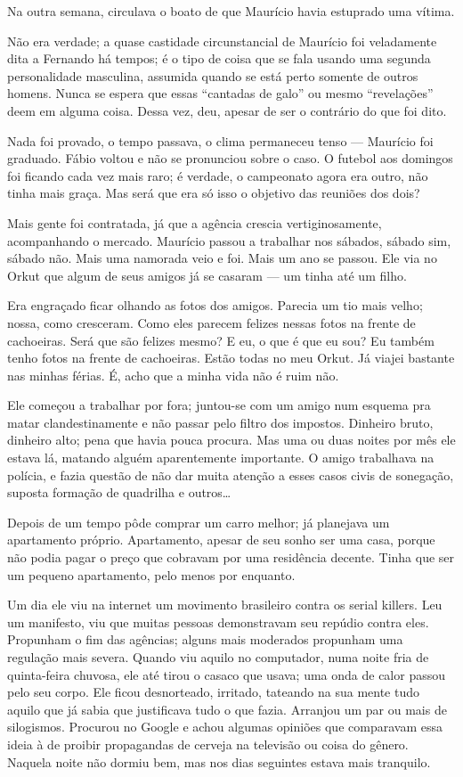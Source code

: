 Na outra semana, circulava o boato de que Maurício havia estuprado uma vítima.

Não era verdade; a quase castidade circunstancial de Maurício foi veladamente dita a Fernando há tempos; é o tipo de coisa que se fala usando uma segunda personalidade masculina, assumida quando se está perto somente de outros homens. Nunca se espera que essas ``cantadas de galo'' ou mesmo ``revelações'' deem em alguma coisa. Dessa vez, deu, apesar de ser o contrário do que foi dito.

Nada foi provado, o tempo passava, o clima permaneceu tenso --- Maurício foi graduado. Fábio voltou e não se pronunciou sobre o caso. O futebol aos domingos foi ficando cada vez mais raro; é verdade, o campeonato agora era outro, não tinha mais graça. Mas será que era só isso o objetivo das reuniões dos dois?

Mais gente foi contratada, já que a agência crescia vertiginosamente, acompanhando o mercado. Maurício passou a trabalhar nos sábados, sábado sim, sábado não. Mais uma namorada veio e foi. Mais um ano se passou. Ele via no Orkut que algum de seus amigos já se casaram --- um tinha até um filho.

Era engraçado ficar olhando as fotos dos amigos. Parecia um tio mais velho; nossa, como cresceram. Como eles parecem felizes nessas fotos na frente de cachoeiras. Será que são felizes mesmo? E eu, o que é que eu sou? Eu também tenho fotos na frente de cachoeiras. Estão todas no meu Orkut. Já viajei bastante nas minhas férias. É, acho que a minha vida não é ruim não.

Ele começou a trabalhar por fora; juntou-se com um amigo num esquema pra matar clandestinamente e não passar pelo filtro dos impostos. Dinheiro bruto, dinheiro alto; pena que havia pouca procura. Mas uma ou duas noites por mês ele estava lá, matando alguém aparentemente importante. O amigo trabalhava na polícia, e fazia questão de não dar muita atenção a esses casos civis de sonegação, suposta formação de quadrilha e outros\ldots\,

Depois de um tempo pôde comprar um carro melhor; já planejava um apartamento próprio. Apartamento, apesar de seu sonho ser uma casa, porque não podia pagar o preço que cobravam por uma residência decente. Tinha que ser um pequeno apartamento, pelo menos por enquanto.

Um dia ele viu na internet um movimento brasileiro contra os \foreignlanguage{english}{serial killers}. Leu um manifesto, viu que muitas pessoas demonstravam seu repúdio contra eles. Propunham o fim das agências; alguns mais moderados propunham uma regulação mais severa. Quando viu aquilo no computador, numa noite fria de quinta-feira chuvosa, ele até tirou o casaco que usava; uma onda de calor passou pelo seu corpo. Ele ficou desnorteado, irritado, tateando na sua mente tudo aquilo que já sabia que justificava tudo o que fazia. Arranjou um par ou mais de silogismos. Procurou no Google e achou algumas opiniões que comparavam essa ideia à de proibir propagandas de cerveja na televisão ou coisa do gênero. Naquela noite não dormiu bem, mas nos dias seguintes estava mais tranquilo.

